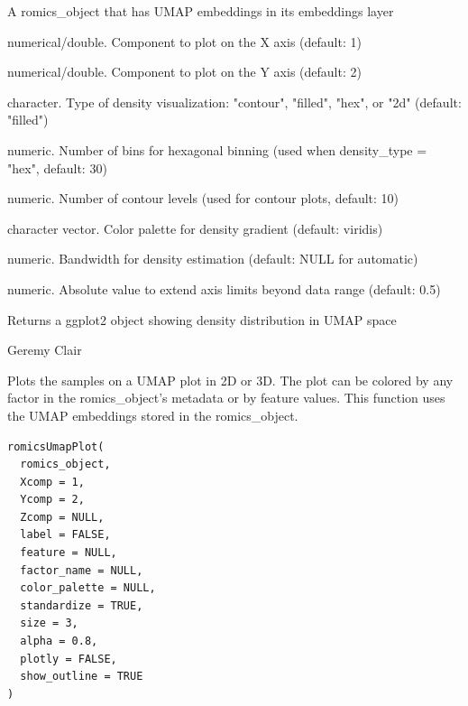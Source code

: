 \documentclass[a4paper]{book}
\begin{document}
\begin{Arguments}
\begin{ldescription}
\item[\code{romics\_object}] A romics\_object that has UMAP embeddings in its embeddings layer

\item[\code{Xcomp}] numerical/double. Component to plot on the X axis (default: 1)

\item[\code{Ycomp}] numerical/double. Component to plot on the Y axis (default: 2)

\item[\code{density\_type}] character. Type of density visualization: "contour", "filled", "hex", or "2d" (default: "filled")

\item[\code{bins}] numeric. Number of bins for hexagonal binning (used when density\_type = "hex", default: 30)

\item[\code{n\_contours}] numeric. Number of contour levels (used for contour plots, default: 10)

\item[\code{color\_palette}] character vector. Color palette for density gradient (default: viridis)

\item[\code{bandwidth}] numeric. Bandwidth for density estimation (default: NULL for automatic)

\item[\code{internal\_margin}] numeric. Absolute value to extend axis limits beyond data range (default: 0.5)
\end{ldescription}
\end{Arguments}
%
\begin{Value}
Returns a ggplot2 object showing density distribution in UMAP space
\end{Value}
%
\begin{Author}
Geremy Clair
\end{Author}
%
\begin{Description}
Plots the samples on a UMAP plot in 2D or 3D.
The plot can be colored by any factor in the romics\_object's metadata or by feature values.
This function uses the UMAP embeddings stored in the romics\_object.
\end{Description}
%
\begin{Usage}
\begin{verbatim}
romicsUmapPlot(
  romics_object,
  Xcomp = 1,
  Ycomp = 2,
  Zcomp = NULL,
  label = FALSE,
  feature = NULL,
  factor_name = NULL,
  color_palette = NULL,
  standardize = TRUE,
  size = 3,
  alpha = 0.8,
  plotly = FALSE,
  show_outline = TRUE
)
\end{verbatim}
\end{Usage}
\end{document}
